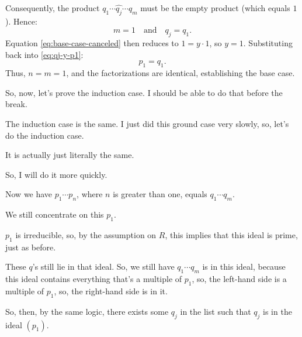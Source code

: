 \begin{proofWrapper}
\begin{content}
Consequently, the product $q_1 \cdots \widehat{q_j} \cdots q_m$ must be the empty product (which equals $1$). Hence:
\begin{equation}\label{eq:base-case-m-equals-1}
m = 1 \quad \text{and} \quad q_j = q_1.
\end{equation}
Equation \eqref{eq:base-case-canceled} then reduces to $1 = y \cdot 1$, so $y = 1$. Substituting back into \eqref{eq:qj-y-p1}:
\begin{equation}\label{eq:base-case-final}
p_1 = q_1.
\end{equation}
Thus, $n = m = 1$, and the factorizations are identical, establishing the base case.
\end{content}

\begin{speech}[00:41:44 - 00:43:15]
So, now, let's prove the induction case. I should be able to do that before the break. 

The induction case is the same. I just did this ground case very slowly, so, let's do the induction case.

It is actually just literally the same. 

So, I will do it more quickly.

Now we have $p_1 \cdots p_n$,  where $n$ is greater than one, equals $q_1 \cdots q_m$. 

We still concentrate on this $p_1$.

$p_1$ is irreducible,  so, by the assumption on $R$, this implies that this ideal is prime,  just as before.

These $q$'s still lie in that ideal. So, we still have $q_1 \cdots q_m$ is in this ideal,  because this ideal contains everything that's a multiple of $p_1$, so, the left-hand side is a multiple of $p_1$, so, the right-hand side is in it.
\end{speech}

\begin{speech}[00:43:15 - 00:45:19]
So, then, by the same logic, there exists some $q_j$ in the list  such that $q_j$ is in the ideal $(p_1)$.


\end{speech}
\end{proofWrapper}
